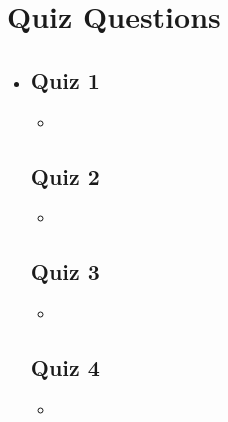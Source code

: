 \section{Quiz Questions}
\begin{itemize}
  \item[]

  \subsection{Quiz 1}
  \begin{itemize}
    \item
  \end{itemize}

  \subsection{Quiz 2}
  \begin{itemize}
    \item
  \end{itemize}

  \subsection{Quiz 3}
  \begin{itemize}
    \item
  \end{itemize}

  \subsection{Quiz 4}
  \begin{itemize}
    \item
  \end{itemize}

\end{itemize}

